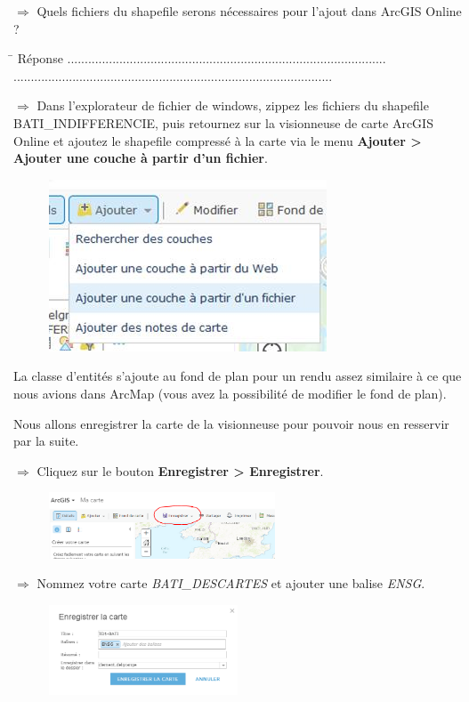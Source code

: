 \documentclass[11pt]{article}
\newcommand{\action}{$\Rightarrow$ }
\newcommand{\reponse}{
	\begin{tabbing}
	\hspace{2cm}\=\kill
	Réponse \> ............................................................................................ \\
 	\> ............................................................................................
	\end{tabbing}
}
\begin{document}
\action Quels fichiers du shapefile serons nécessaires pour l'ajout dans ArcGIS Online ?

\reponse

\action Dans l'explorateur de fichier de windows, zippez les fichiers du shapefile BATI\_INDIFFERENCIE, puis retournez sur la visionneuse de carte ArcGIS Online et ajoutez le shapefile compressé à la carte via le menu \textbf{Ajouter > Ajouter une couche à partir d'un fichier}.
\begin{figure}[H]
	\center \includegraphics{img/cours3/ago_ajout_couche.jpg} \\
\end{figure}

La classe d'entités s'ajoute au fond de plan pour un rendu assez similaire à ce que nous avions dans ArcMap (vous avez la possibilité de modifier le fond de plan).

Nous allons enregistrer la carte de la visionneuse pour pouvoir nous en resservir par la suite.

\action Cliquez sur le bouton \textbf{Enregistrer > Enregistrer}.
\begin{figure}[H]
	\center \includegraphics[width=0.6\textwidth]{img/cours3/ago_enregistrer_carte.png} \\
\end{figure}

\action Nommez votre carte \textit{BATI\_DESCARTES} et ajouter une balise \textit{ENSG}.
\begin{figure}[H]
	\center \includegraphics[width=0.5\textwidth]{img/cours3/ago_enregistrer_carte-2.png} \\
\end{figure}
\end{document}
